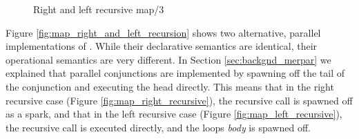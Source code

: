 \begin{figure}
\begin{center}
%
\end{center}
\caption{Right and left recursive map/3}
\label{fig:map_right_and_left_recursive}
\end{figure}

Figure \ref{fig:map_right_and_left_recursion} shows two alternative, parallel
implementations of .
While their declarative semantics are identical,
their operational semantics are very different.  In Section
\ref{sec:backgnd_merpar} we explained that parallel conjunctions are
implemented by spawning off the tail of the conjunction and executing the
head directly.
This means that in the right recursive case (Figure
\ref{fig:map_right_recursive}), the recursive call is spawned off as a
spark,
and that in the left recursive case (Figure \ref{fig:map_left_recursive}),
the recursive call is executed directly, and the loops \emph{body} is
spawned off.


